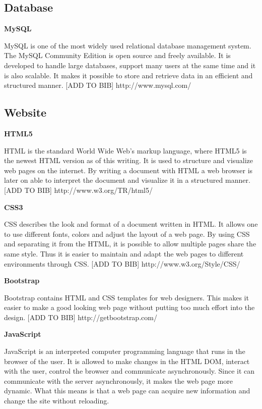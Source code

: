 \subsection{Database}

\textbf{MySQL}

MySQL is one of the most widely used relational database management system.
The MySQL Community Edition is open source and freely available.
It is developed to handle large databases, support many users at the same time and it is also scalable.
It makes it possible to store and retrieve data in an efficient and structured manner.
[ADD TO BIB]
http://www.mysql.com/

\subsection{Website}

\textbf{HTML5}

HTML is the standard World Wide Web's markup language, where HTML5 is the newest HTML version as of this writing.
It is used to structure and visualize web pages on the internet.
By writing a document with HTML a web browser is later on able to interpret the document and visualize it in a structured manner.
[ADD TO BIB]
http://www.w3.org/TR/html5/

\textbf{CSS3}

CSS describes the look and format of a document written in HTML.
It allows one to use different fonts, colors and adjust the layout of a web page.
By using CSS and separating it from the HTML, it is possible to allow multiple pages share the same style.
Thus it is easier to maintain and adapt the web pages to different environments through CSS.
[ADD TO BIB]
http://www.w3.org/Style/CSS/

\textbf{Bootstrap}

Bootstrap contains HTML and CSS templates for web designers.
This makes it easier to make a good looking web page without putting too much effort into the design.
[ADD TO BIB]
http://getbootstrap.com/

\textbf{JavaScript}

JavaScript is an interpreted computer programming language that runs in the browser of the user.
It is allowed to make changes in the HTML DOM, interact with the user, control the browser and communicate asynchronously.
Since it can communicate with the server asynchronously, it makes the web page more dynamic.
What this means is that a web page can acquire new information and change the site without reloading.

